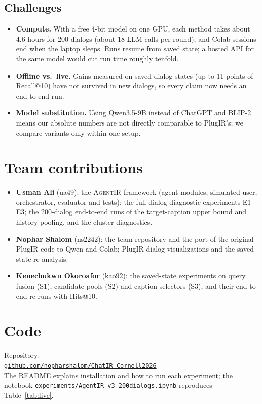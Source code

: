 \documentclass[sigconf,nonacm]{acmart}
\begin{document}
\subsection{Challenges}
\begin{itemize}
\item \textbf{Compute.} With a free 4-bit model on one GPU, each method takes about 4.6 hours for
  200 dialogs (about 18 LLM calls per round), and Colab sessions end when the laptop sleeps. Runs
  resume from saved state; a hosted API for the same model would cut run time roughly tenfold.
\item \textbf{Offline vs.\ live.} Gains measured on saved dialog states (up to 11 points of
  Recall@10) have not survived in new dialogs, so every claim now needs an end-to-end run.
\item \textbf{Model substitution.} Using Qwen3.5-9B instead of ChatGPT and BLIP-2 means our
  absolute numbers are not directly comparable to PlugIR's; we compare variants only within one
  setup.
\end{itemize}

\section{Team contributions}
\label{sec:team}
\begin{itemize}
\item \textbf{Usman Ali} (ua49): the \textsc{AgentIR} framework (agent modules, simulated user,
  orchestrator, evaluator and tests); the full-dialog diagnostic experiments E1--E3; the
  200-dialog end-to-end runs of the target-caption upper bound and history pooling, and the
  cluster diagnostics.
\item \textbf{Nophar Shalom} (ns2242): the team repository and the port of the original PlugIR code
  to Qwen and Colab; PlugIR dialog visualizations and the saved-state re-analysis.
\item \textbf{Kenechukwu Okoroafor} (kao92): the saved-state experiments on query fusion (S1),
  candidate pools (S2) and caption selectors (S3), and their end-to-end re-runs with Hits@10.
\end{itemize}

\section*{Code}
Repository:\\
\href{https://github.com/nopharshalom/ChatIR-Cornell2026}{\texttt{github.com/nopharshalom/ChatIR-Cornell2026}}\\
The README explains installation and how to run each experiment; the notebook
\texttt{experiments/AgentIR\_v3\_200dialogs.ipynb} reproduces Table~\ref{tab:live}.



\end{document}
